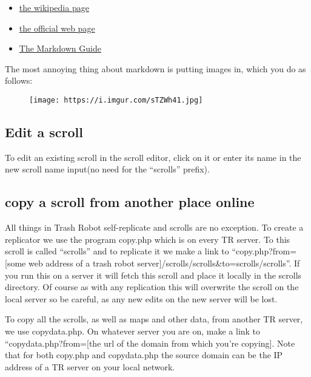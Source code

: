 \begin{itemize}
\tightlist
\item
  \href{https://en.wikipedia.org/wiki/Markdown}{the wikipedia page}
\item
  \href{https://daringfireball.net/projects/markdown/}{the official web
  page}
\item
  \href{https://www.markdownguide.org/}{The Markdown Guide}
\end{itemize}

The most annoying thing about markdown is putting images in, which you
do as follows:

\begin{figure}[htbp]
\centering
\texttt{[image: https://i.imgur.com/sTZWh41.jpg]}
\caption{}
\end{figure}

\subsection{Edit a scroll}\label{edit-a-scroll}

To edit an existing scroll in the scroll editor, click on it or enter
its name in the new scroll name input(no need for the ``scrolls''
prefix).

\subsection{copy a scroll from another place
online}\label{copy-a-scroll-from-another-place-online}

All things in Trash Robot self-replicate and scrolls are no exception.
To create a replicator we use the program copy.php which is on every TR
server. To this scroll is called ``scrolls'' and to replicate it we make
a link to ``copy.php?from={[}some web address of a trash robot
server{]}/scrolls/scrolls\&to=scrolls/scrolls''. If you run this on a
server it will fetch this scroll and place it locally in the scrolls
directory. Of course as with any replication this will overwrite the
scroll on the local server so be careful, as any new edits on the new
server will be lost.

To copy all the scrolls, as well as maps and other data, from another TR
server, we use copydata.php. On whatever server you are on, make a link
to ``copydata.php?from={[}the url of the domain from which you're
copying{]}. Note that for both copy.php and copydata.php the source
domain can be the IP address of a TR server on your local network.

